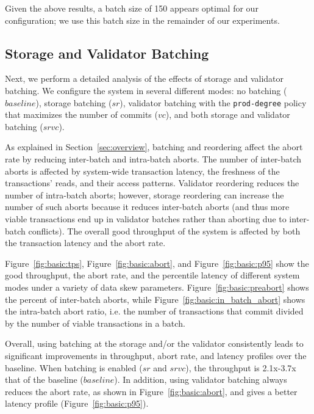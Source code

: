 Given the above results, a batch size of 150 appears optimal for our configuration; we use this batch size in the remainder of our experiments. 

\subsection{Storage and Validator Batching}
\label{subsec:experiment:batching}

Next, we perform a detailed analysis of the effects of storage and validator batching. We configure the system in several different modes: no batching ($baseline$), storage batching ($sr$), validator batching with the \texttt{prod-degree} policy that maximizes the number of commits ($vc$), and both storage and validator batching ($srvc$).


As explained in Section~\ref{sec:overview}, batching and reordering affect the abort rate by reducing inter-batch and intra-batch aborts. The number of inter-batch aborts is affected by system-wide transaction latency, the freshness of the transactions' reads, and their access patterns. Validator reordering reduces the number of intra-batch aborts; however, storage reordering can increase the number of such aborts because it reduces inter-batch aborts (and thus more viable transactions end up in validator batches rather than aborting due to inter-batch conflicts). The overall good throughput of the system is affected by both the transaction latency and the abort rate. 


Figure~\ref{fig:basic:tps}, Figure~\ref{fig:basic:abort}, and Figure~\ref{fig:basic:p95} show the good throughput, the abort rate, and the percentile latency of different system modes under a variety of data skew parameters. Figure~\ref{fig:basic:preabort} shows the percent of inter-batch aborts, while Figure~\ref{fig:basic:in_batch_abort} shows the intra-batch abort ratio, i.e. the number of transactions that commit divided by the number of viable transactions in a batch.


Overall, using batching at the storage and/or the validator consistently leads to significant improvements in throughput, abort rate, and latency profiles over the baseline. When batching is enabled ($sr$ and $srvc$), the throughput is 2.1x-3.7x that of the baseline ($baseline$). In addition, using validator batching always reduces the abort rate, as shown in Figure~\ref{fig:basic:abort}, and gives a better latency profile (Figure~\ref{fig:basic:p95}).

